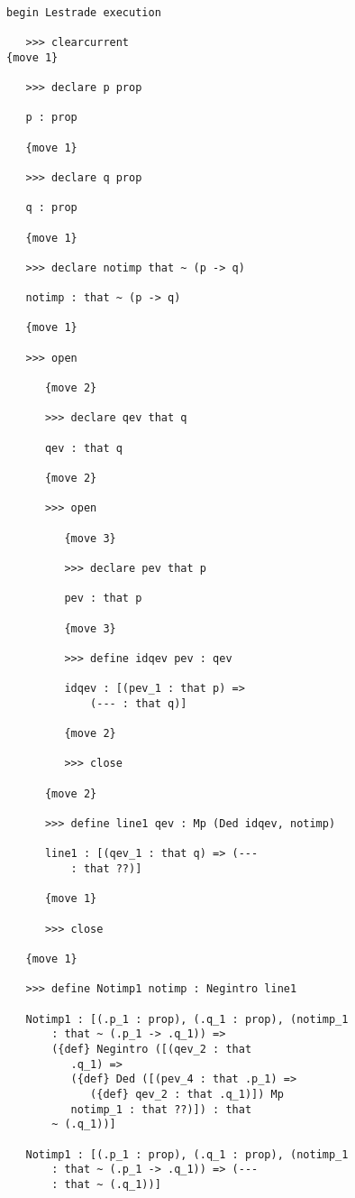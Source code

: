 \documentclass[12pt]{article}
\begin{document}
\begin{verbatim}

begin Lestrade execution

   >>> clearcurrent
{move 1}

   >>> declare p prop

   p : prop

   {move 1}

   >>> declare q prop

   q : prop

   {move 1}

   >>> declare notimp that ~ (p -> q)

   notimp : that ~ (p -> q)

   {move 1}

   >>> open

      {move 2}

      >>> declare qev that q

      qev : that q

      {move 2}

      >>> open

         {move 3}

         >>> declare pev that p

         pev : that p

         {move 3}

         >>> define idqev pev : qev

         idqev : [(pev_1 : that p) => 
             (--- : that q)]

         {move 2}

         >>> close

      {move 2}

      >>> define line1 qev : Mp (Ded idqev, notimp)

      line1 : [(qev_1 : that q) => (--- 
          : that ??)]

      {move 1}

      >>> close

   {move 1}

   >>> define Notimp1 notimp : Negintro line1

   Notimp1 : [(.p_1 : prop), (.q_1 : prop), (notimp_1 
       : that ~ (.p_1 -> .q_1)) => 
       ({def} Negintro ([(qev_2 : that 
          .q_1) => 
          ({def} Ded ([(pev_4 : that .p_1) => 
             ({def} qev_2 : that .q_1)]) Mp 
          notimp_1 : that ??)]) : that 
       ~ (.q_1))]

   Notimp1 : [(.p_1 : prop), (.q_1 : prop), (notimp_1 
       : that ~ (.p_1 -> .q_1)) => (--- 
       : that ~ (.q_1))]


\end{verbatim}
\end{document}
